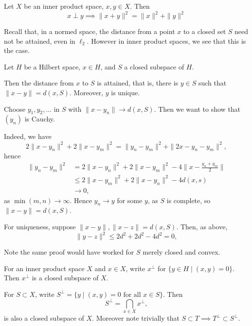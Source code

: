 \documentclass[12pt]{article}
\begin{document}
\begin{proposition}
	Let $X$ be an inner product space, $x, y \in X$. Then
	\[
	x \perp y \implies \|x+y\|^2 = \|x\|^2 + \|y\|^2
	\]
\end{proposition}

Recall that, in a normed space, the distance from a point $x$ to a closed set $S$ need not be attained, even in $\ell_2$. However in inner product spaces, we see that this is the case.

\begin{theorem}
	Let $H$ be a Hilbert space, $x \in H$, and $S$ a closed subspace of $H$.

	Then the distance from $x$ to $S$ is attained, that is, there is $y \in S$ such that $\|x-y\| = d(x, S)$. Moreover, $y$ is unique.
\end{theorem}

\begin{proofbox}
	Choose $y_1, y_2, \ldots$ in $S$ with $\|x - y_n\| \to d(x, S)$. Then we want to show that $(y_n)$ is Cauchy.

	Indeed, we have
	\[
	2\|x-y_n\|^2 + 2\|x-y_m\|^2 = \|y_n-y_m\|^2 + \|2x - y_n - y_m\|^2,
	\]
	hence
	\begin{align*}
		\|y_n-y_m\|^2 &= 2\|x-y_n\|^2 + 2\|x-y_m\|^2 - 4 \bigl\| x - \frac{y_n + y_m}{2} \bigr\| \\
			      &\leq 2\|x-y_m\|^2 + 2\|x-y_n\|^2 - 4 d(x, s) \\
			      &\to 0,
	\end{align*}
	as $\min(m, n) \to \infty$. Hence $y_n \to y$ for some $y$, as $S$ is complete, so $\|x - y\| = d(x, S)$.

	For uniqueness, suppose $\|x - y\|, \|x-z\| = d(x, S)$. Then, as above,
	\[
	\|y - z\|^2 \leq 2d^2 + 2d^2 - 4d^2 = 0,
	\]
\end{proofbox}

Note the same proof would have worked for $S$ merely closed and convex.


For an inner product space $X$ and $x \in X$, write $x^{\perp}$ for $\{y \in H \mid (x, y) = 0\}$. Then $x^{\perp}$ is a closed subspace of $X$.

For $S \subset X$, write $S^{\perp} = \{y \mid (x, y) = 0 \text{ for all } x \in S\}$. Then
\[
S^{\perp} = \bigcap_{x \in X} x^{\perp},
\]
is also a closed subspace of $X$. Moreover note trivially that $S \subset T \implies T^{\perp} \subset S^{\perp}$.
\end{document}
